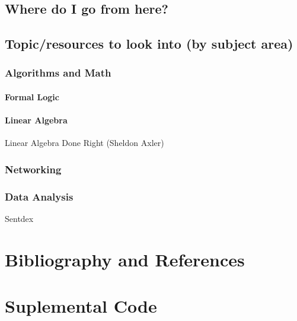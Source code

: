 \documentclass[12pt,a4paper]{book}
\begin{document}
		\section{Where do I go from here?}
		\section{Topic/resources to look into (by subject area)}
			\subsection{Algorithms and Math}
				\subsubsection{Formal Logic}
				
				\subsubsection{Linear Algebra}
					Linear Algebra Done Right (Sheldon Axler)
					
			\subsection{Networking}
				
			\subsection{Data Analysis}
				Sentdex
	\appendix 
	\chapter{Bibliography and References} \label{chap:apdx-bib}
		\printbibliography[heading=none]
	\chapter{Suplemental Code} \label{chap:apdx-sup-code}
\end{document}

